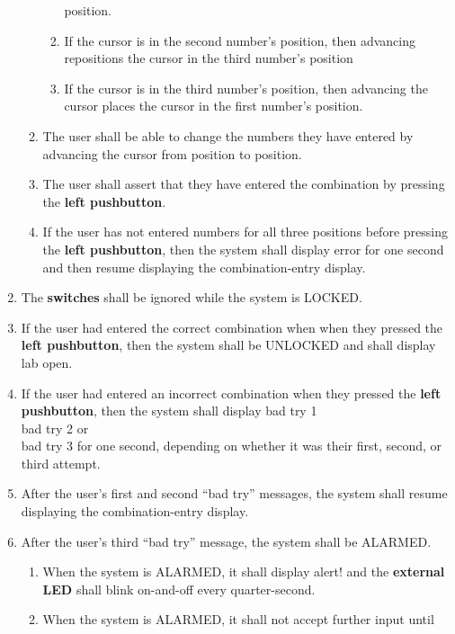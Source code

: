 \begin{enumerate}
\begin{enumerate}
\begin{enumerate}
            position.
        \item If the cursor is in the second number's position, then
            advancing repositions the cursor in the third number's position
        \item If the cursor is in the third number's position, then
            advancing the cursor places the cursor in the first number's
            position.
        \end{enumerate}
    \item The user shall be able to change the numbers they have entered by
        advancing the cursor from position to position.
    \item The user shall assert that they have entered the combination by
        pressing the \textbf{left pushbutton}.
    \item If the user has not entered numbers for all three positions before
        pressing the \textbf{left pushbutton}, then the system shall display
        {\dviiseg \phantom{888}error} for one second and then resume displaying
        the combination-entry display.
    \end{enumerate}
\item The \textbf{switches} shall be ignored while the system is LOCKED.
\item If the user had entered the correct combination when when they pressed
    the \textbf{left pushbutton}, then the system shall be UNLOCKED and shall
    display {\dviiseg lab open}.
\item If the user had entered an incorrect combination when they pressed the
    \textbf{left pushbutton}, then the system shall display
    {\dviiseg bad try 1} \\ {\dviiseg bad try 2} or \\ {\dviiseg bad try 3} for
    one second, depending on whether it was their first, second, or third
    attempt.
\item After the user's first and second ``bad try'' messages, the system shall
    resume displaying the combination-entry display.
\item After the user's third ``bad try'' message, the system shall be ALARMED.
    \begin{enumerate}
    \item When the system is ALARMED, it shall display {\dviiseg alert!} and
        the \textbf{external LED} shall blink on-and-off every quarter-second.
    \item When the system is ALARMED, it shall not accept further input until

\end{enumerate}
\end{enumerate}
